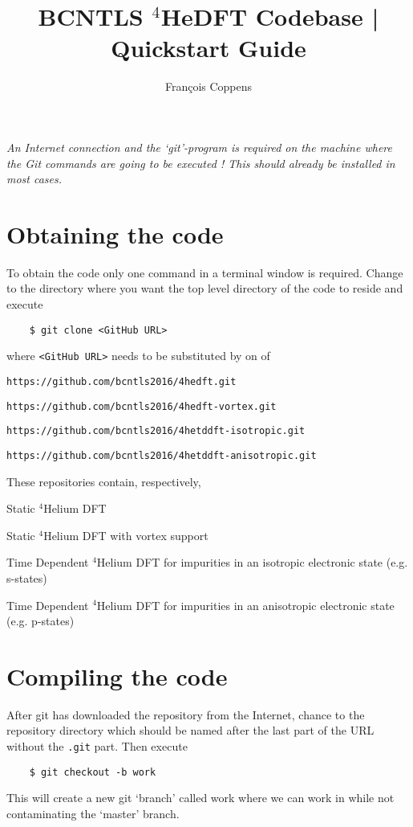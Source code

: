 \documentclass[10pt,a4paper]{article}
\author{Fran\c{c}ois Coppens}
\title{BCNTLS $^4$HeDFT Codebase | Quickstart Guide }
\begin{document}
	\maketitle
	\emph{An Internet connection and the `git'-program is required on the machine where the Git commands are going to be executed ! This should already be installed in most cases.}
	\section{Obtaining the code}
	To obtain the code only one command in a terminal window is required. Change to the directory where you want the top level directory of the code to reside and execute
	\begin{verbatim}
	$ git clone <GitHub URL>
	\end{verbatim}
	where \verb|<GitHub URL>| needs to be substituted by on of
	\begin{description}[align=right,labelwidth=0.35cm]
		\item[1.] \verb|https://github.com/bcntls2016/4hedft.git|
		\item[2.] \verb|https://github.com/bcntls2016/4hedft-vortex.git|
		\item[3.] \verb|https://github.com/bcntls2016/4hetddft-isotropic.git|
		\item[4.] \verb|https://github.com/bcntls2016/4hetddft-anisotropic.git|
	\end{description}

	\noindent These repositories contain, respectively,

	\begin{description}[align=right,labelwidth=0.35cm]
	\item [1.] Static $^4$Helium DFT
	\item[2.] Static $^4$Helium DFT with vortex support
	\item[3.] Time Dependent $^4$Helium DFT for impurities in an isotropic electronic state (e.g. s-states)
	\item[4.] Time Dependent $^4$Helium DFT for impurities in an anisotropic electronic state (e.g. p-states)
	\end{description}

	\section{Compiling the code}
	After git has downloaded the repository from the Internet, chance to the repository directory which should be named after the last part of the URL without the \verb|.git| part. Then execute
	\begin{verbatim}
	$ git checkout -b work
	\end{verbatim}
	This will create a new git `branch' called work where we can work in while not contaminating the `master' branch.
\end{document}

